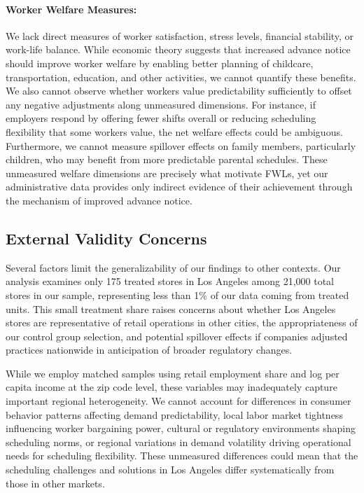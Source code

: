 \documentclass[letterpaper,11pt,leqno]{article}
\theoremstyle{paper}
\begin{document}
\paragraph{Worker Welfare Measures:} We lack direct measures of worker satisfaction, stress levels, financial stability, or work-life balance. While economic theory suggests that increased advance notice should improve worker welfare by enabling better planning of childcare, transportation, education, and other activities, we cannot quantify these benefits. We also cannot observe whether workers value predictability sufficiently to offset any negative adjustments along unmeasured dimensions. For instance, if employers respond by offering fewer shifts overall or reducing scheduling flexibility that some workers value, the net welfare effects could be ambiguous. Furthermore, we cannot measure spillover effects on family members, particularly children, who may benefit from more predictable parental schedules. These unmeasured welfare dimensions are precisely what motivate FWLs, yet our administrative data provides only indirect evidence of their achievement through the mechanism of improved advance notice.

\subsection{External Validity Concerns}

Several factors limit the generalizability of our findings to other contexts. Our analysis examines only 175 treated stores in Los Angeles among 21,000 total stores in our sample, representing less than 1\% of our data coming from treated units. This small treatment share raises concerns about whether Los Angeles stores are representative of retail operations in other cities, the appropriateness of our control group selection, and potential spillover effects if companies adjusted practices nationwide in anticipation of broader regulatory changes.

While we employ matched samples using retail employment share and log per capita income at the zip code level, these variables may inadequately capture important regional heterogeneity. We cannot account for differences in consumer behavior patterns affecting demand predictability, local labor market tightness influencing worker bargaining power, cultural or regulatory environments shaping scheduling norms, or regional variations in demand volatility driving operational needs for scheduling flexibility. These unmeasured differences could mean that the scheduling challenges and solutions in Los Angeles differ systematically from those in other markets.
\end{document}
